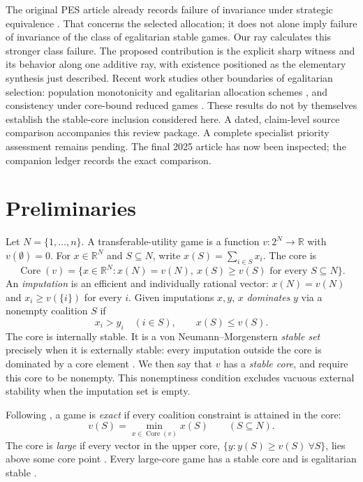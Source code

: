 \documentclass[11pt]{article}
\newcommand{\R}{\mathbb{R}}
\newcommand{\core}{\operatorname{Core}}
\begin{document}
The original PES article already records failure of invariance under
strategic equivalence \citep[][p.~185]{DBH2017}. That concerns the selected
allocation; it does not alone imply failure of invariance of the class of
egalitarian stable games. Our ray calculates this stronger class failure.
The proposed contribution is the explicit sharp witness and its behavior
along one additive ray, with existence positioned as the elementary
synthesis just described. Recent work studies other
boundaries of egalitarian selection: population monotonicity and egalitarian
allocation schemes \citep{DietzenbacherDogan2025}, and consistency under
core-bound reduced games \citep{GongDietzenbacher2026}. These results do not by
themselves establish the stable-core inclusion considered here. A dated,
claim-level source comparison accompanies this review package. A complete
specialist priority assessment remains pending. The final 2025 article has
now been inspected; the companion ledger records the exact comparison.

\section{Preliminaries}\label{sec:prelim}

Let $N=\{1,\dots,n\}$. A transferable-utility game is a function
$v\colon 2^N\to\R$ with $v(\emptyset)=0$. For $x\in\R^N$ and $S\subseteq N$,
write $x(S)=\sum_{i\in S}x_i$. The core is
\[
 \core(v)=
 \{x\in\R^N:x(N)=v(N),\ x(S)\ge v(S)\text{ for every }S\subseteq N\}.
\]
An \emph{imputation} is an efficient and individually rational vector:
$x(N)=v(N)$ and $x_i\ge v(\{i\})$ for every $i$. Given imputations $x,y$,
$x$ \emph{dominates} $y$ via a nonempty coalition $S$ if
\[
 x_i>y_i\quad(i\in S),\qquad x(S)\le v(S).
\]
The core is internally stable. It is a von Neumann--Morgenstern
\emph{stable set} precisely when it is externally stable: every imputation
outside the core is dominated by a core element \citep{vNM1944}. We then say
that $v$ has a \emph{stable core}, and require this core to be nonempty.
This nonemptiness condition excludes vacuous external stability when the
imputation set is empty.

Following \citet{Schmeidler1972}, a game is \emph{exact} if every coalition
constraint is attained in the core:
\[
 v(S)=\min_{x\in\core(v)}x(S)\qquad(S\subseteq N).
\]
The core is \emph{large} if every vector in the upper core,
$\{y:y(S)\ge v(S)\ \forall S\}$, lies above some core point
\citep{Sharkey1982}. Every large-core game has a stable core and is
egalitarian stable \citep{Sharkey1982,Dietzenbacher2021}.
\end{document}
